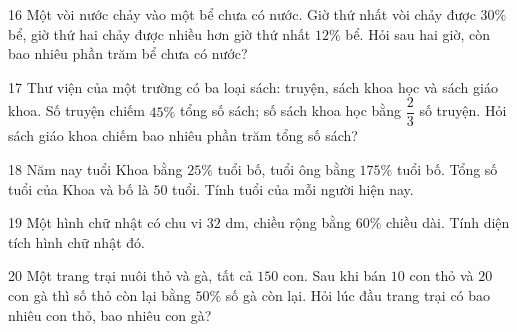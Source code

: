 \gap
\begin{probbox}{16}{\relax}
Một vòi nước chảy vào một bể chưa có nước. Giờ thứ nhất vòi chảy được $30\%$ bể, giờ thứ hai chảy được nhiều hơn giờ thứ nhất $12\%$ bể. Hỏi sau hai giờ, còn bao nhiêu phần trăm bể chưa có nước?
\end{probbox}
\gap
\begin{probbox}{17}{\relax}
Thư viện của một trường có ba loại sách: truyện, sách khoa học và sách giáo khoa. Số truyện chiếm $45\%$ tổng số sách; số sách khoa học bằng $\dfrac23$ số truyện. Hỏi sách giáo khoa chiếm bao nhiêu phần trăm tổng số sách?
\end{probbox}
\gap
\begin{probbox}{18}{\relax}
Năm nay tuổi Khoa bằng $25\%$ tuổi bố, tuổi ông bằng $175\%$ tuổi bố. Tổng số tuổi của Khoa và bố là $50$ tuổi. Tính tuổi của mỗi người hiện nay.
\end{probbox}
\gap
\begin{probbox}{19}{\relax}
Một hình chữ nhật có chu vi $32$ dm, chiều rộng bằng $60\%$ chiều dài. Tính diện tích hình chữ nhật đó.
\end{probbox}
\gap
\begin{probbox}{20}{\relax}
Một trang trại nuôi thỏ và gà, tất cả $150$ con. Sau khi bán $10$ con thỏ và $20$ con gà thì số thỏ còn lại bằng $50\%$ số gà còn lại. Hỏi lúc đầu trang trại có bao nhiêu con thỏ, bao nhiêu con gà?
\end{probbox}
